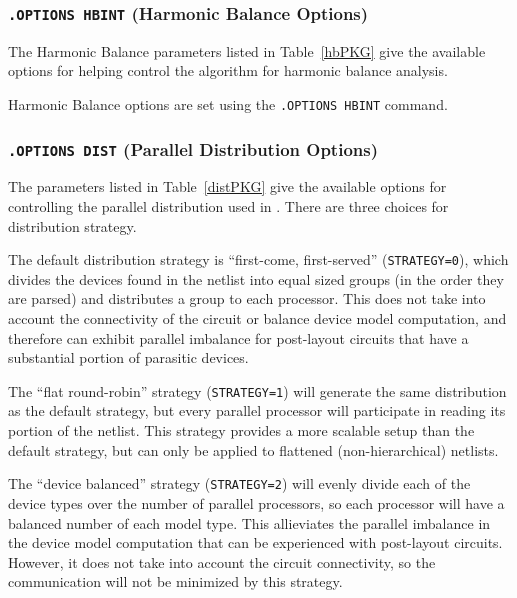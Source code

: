 

\subsubsection{\texttt{.OPTIONS HBINT} (Harmonic Balance Options)}

The Harmonic Balance parameters listed in Table~\ref{hbPKG} give the available
options for helping control the algorithm for harmonic balance analysis.

Harmonic Balance options are set using the \texttt{.OPTIONS HBINT} command.



\subsubsection{\texttt{.OPTIONS DIST} (Parallel Distribution Options)}

The parameters listed in Table~\ref{distPKG} give the available
options for controlling the parallel distribution used in \Xyce{}.
There are three choices for distribution strategy.

The default distribution strategy is ``first-come, first-served''
(\texttt{STRATEGY=0}), which divides the devices found in the netlist
into equal sized groups (in the order they are parsed) and distributes
a group to each processor.  This does not take into account the
connectivity of the circuit or balance device model computation, and
therefore can exhibit parallel imbalance for post-layout circuits that
have a substantial portion of parasitic devices.

The ``flat round-robin'' strategy (\texttt{STRATEGY=1}) will generate
the same distribution as the default strategy, but every parallel
processor will participate in reading its portion of the netlist.
This strategy provides a more scalable setup than the default
strategy, but can only be applied to flattened (non-hierarchical)
netlists.

The ``device balanced'' strategy (\texttt{STRATEGY=2}) will evenly
divide each of the device types over the number of parallel
processors, so each processor will have a balanced number of each
model type.  This allieviates the parallel imbalance in the device
model computation that can be experienced with post-layout circuits.
However, it does not take into account the circuit connectivity, so
the communication will not be minimized by this strategy.


